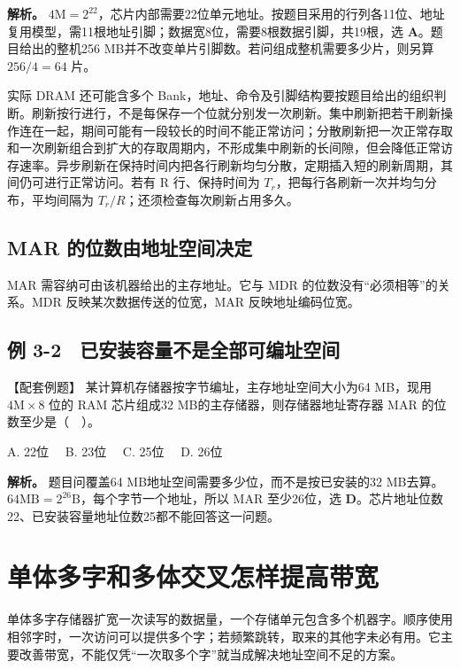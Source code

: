 \textbf{解析。} \(4\mathrm M=2^{22}\)，芯片内部需要22位单元地址。按题目采用的行列各11位、地址复用模型，需11根地址引脚；数据宽8位，需要8根数据引脚，共19根，选 \textbf{A}。题目给出的整机256 MB并不改变单片引脚数。若问组成整机需要多少片，则另算 \(256/4=64\) 片。

实际 DRAM 还可能含多个 Bank，地址、命令及引脚结构要按题目给出的组织判断。刷新按行进行，不是每保存一个位就分别发一次刷新。集中刷新把若干刷新操作连在一起，期间可能有一段较长的时间不能正常访问；分散刷新把一次正常存取和一次刷新组合到扩大的存取周期内，不形成集中刷新的长间隙，但会降低正常访存速率。异步刷新在保持时间内把各行刷新均匀分散，定期插入短的刷新周期，其间仍可进行正常访问。若有 R 行、保持时间为 \(T_r\)，把每行各刷新一次并均匀分布，平均间隔为 \(T_r/R\)；还须检查每次刷新占用多久。

\subsection{MAR 的位数由地址空间决定}\label{CO03-06}

MAR 需容纳可由该机器给出的主存地址。它与 MDR 的位数没有``必须相等''的关系。MDR 反映某次数据传送的位宽，MAR 反映地址编码位宽。

\subsection{例 3-2　已安装容量不是全部可编址空间}\label{CO03-07}

\begin{example}[配套例题]

【配套例题】 某计算机存储器按字节编址，主存地址空间大小为64 MB，现用 \(4\mathrm M\times8\) 位的 RAM 芯片组成32 MB的主存储器，则存储器地址寄存器 MAR 的位数至少是（　）。

A. 22位　 B. 23位　 C. 25位　 D. 26位

\end{example}

\textbf{解析。} 题目问覆盖64 MB地址空间需要多少位，而不是按已安装的32 MB去算。\(64\mathrm{MB}=2^{26}\mathrm B\)，每个字节一个地址，所以 MAR 至少26位，选 \textbf{D}。芯片地址位数22、已安装容量地址位数25都不能回答这一问题。

\section{单体多字和多体交叉怎样提高带宽}\label{CO03-08}

单体多字存储器扩宽一次读写的数据量，一个存储单元包含多个机器字。顺序使用相邻字时，一次访问可以提供多个字；若频繁跳转，取来的其他字未必有用。它主要改善带宽，不能仅凭``一次取多个字''就当成解决地址空间不足的方案。

